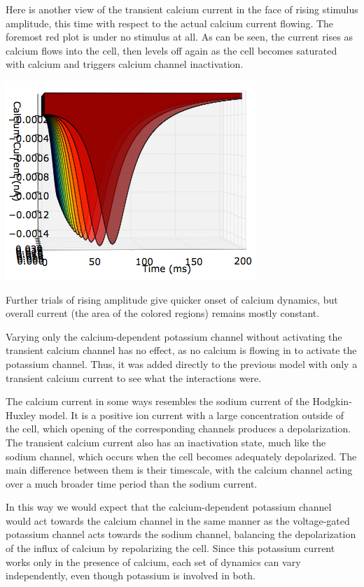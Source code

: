 \documentclass[12pt]{article}
\begin{document}
Here is another view of the transient calcium current in the face of rising stimulus amplitude, this time with respect to the actual calcium current flowing.  The foremost red plot is under no stimulus at all.  As can be seen, the current rises as calcium flows into the cell, then levels off again as the cell becomes saturated with calcium and triggers calcium channel inactivation.  

\includegraphics[scale=0.8]{calciumcurrent.png}

Further trials of rising amplitude give quicker onset of calcium dynamics, but overall current (the area of the colored regions) remains mostly constant.

Varying only the calcium-dependent potassium channel without activating the transient calcium channel has no effect, as no calcium is flowing in to activate the potassium channel.  Thus, it was added directly to the previous model with only a transient calcium current to see what the interactions were.  

The calcium current in some ways resembles the sodium current of the Hodgkin-Huxley model.  It is a positive ion current with a large concentration outside of the cell, which opening of the corresponding channels produces a depolarization.  The transient calcium current also has an inactivation state, much like the sodium channel, which occurs when the cell becomes adequately depolarized.  The main difference between them is their timescale, with the calcium channel acting over a much broader time period than the sodium current.  

In this way we would expect that the calcium-dependent potassium channel would act towards the calcium channel in the same manner as the voltage-gated potassium channel acts towards the sodium channel, balancing the depolarization of the influx of calcium by repolarizing the cell.  Since this potassium current works only in the presence of calcium, each set of dynamics can vary independently, even though potassium is involved in both.  
\end{document}
